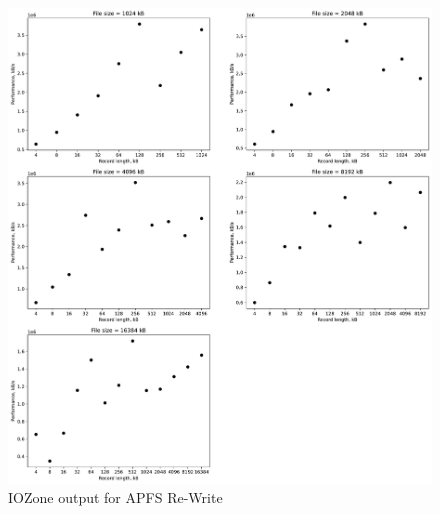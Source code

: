\begin{figure}[!htb]
	\label{fig:app_bench_apfs_re_write}
	\begin{center}
		\includegraphics[width=1.0\textwidth]{figures/benchmarking/local/Re-Write.pdf}
	\end{center}
	\caption{IOZone output for \gls{APFS} Re-Write}
\end{figure}


